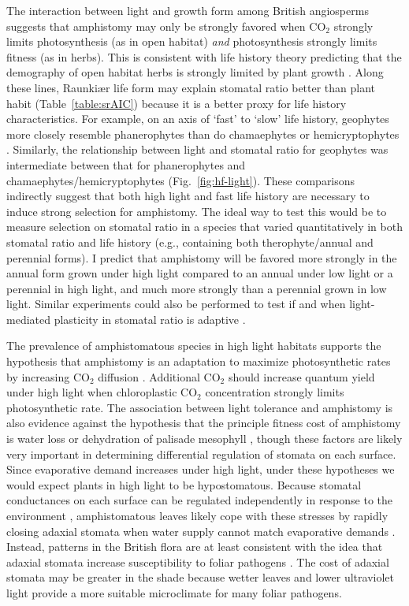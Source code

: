 \documentclass[12pt, oneside]{article}
\begin{document}
The interaction between light and growth form among British angiosperms suggests that amphistomy may only be strongly favored when CO$_2$ strongly limits photosynthesis (as in open habitat) \textit{and} photosynthesis strongly limits fitness (as in herbs). This is consistent with life history theory predicting that the demography of open habitat herbs is strongly limited by plant growth \citep{Franco_Silvertown_1996}. Along these lines, Raunki\ae r life form may explain stomatal ratio better than plant habit (Table~\ref{table:srAIC}) because it is a better proxy for life history characteristics. For example, on an axis of `fast' to `slow' life history, geophytes more closely resemble phanerophytes than do chamaephytes or hemicryptophytes \citep{Salguero-Gomez_etal_2016}. Similarly, the relationship between light and stomatal ratio for geophytes was intermediate between that for phanerophytes and chamaephytes/hemicryptophytes (Fig.~\ref{fig:hf-light}). These comparisons indirectly suggest that both high light and fast life history are necessary to induce strong selection for amphistomy. The ideal way to test this would be to measure selection on stomatal ratio in a species that varied quantitatively in both stomatal ratio and life history (e.g., containing both therophyte/annual and perennial forms). I predict that amphistomy will be favored more strongly in the annual form grown under high light compared to an annual under low light or a perennial in high light, and much more strongly than a perennial grown in low light. Similar experiments could also be performed to test if and when light-mediated plasticity in stomatal ratio is adaptive \citep{Gay_Hurd_1975, Mott_Michaelson_1991, Fontana_etal_2017}.

The prevalence of amphistomatous species in high light habitats supports the hypothesis that amphistomy is an adaptation to maximize photosynthetic rates by increasing CO$_2$ diffusion \citep{Jones_1985}. Additional CO$_2$ should increase quantum yield under high light when chloroplastic CO$_2$ concentration strongly limits photosynthetic rate. The association between light tolerance and amphistomy is also evidence against the hypothesis that the principle fitness cost of amphistomy is water loss \citep{Darwin_1886, Foster_Smith_1986} or dehydration of palisade mesophyll \citep{Buckley_etal_2015}, though these factors are likely very important in determining differential regulation of stomata on each surface. Since evaporative demand increases under high light, under these hypotheses we would expect plants in high light to be hypostomatous. Because stomatal conductances on each surface can be regulated independently in response to the environment \citep{Darwin_1898, Pospisilova_Solarova_1980, Smith_1981, Reich_1984, Mott_Oleary_1984}, amphistomatous leaves likely cope with these stresses by rapidly closing adaxial stomata when water supply cannot match evaporative demands \citep{Richardson_etal_2017}. Instead, patterns in the British flora are at least consistent with the idea that adaxial stomata increase susceptibility to foliar pathogens \citep{Gutschick_1984b, Mckown_etal_2014}. The cost of adaxial stomata may be greater in the shade because wetter leaves and lower ultraviolet light provide a more suitable microclimate for many foliar pathogens.
\end{document}
